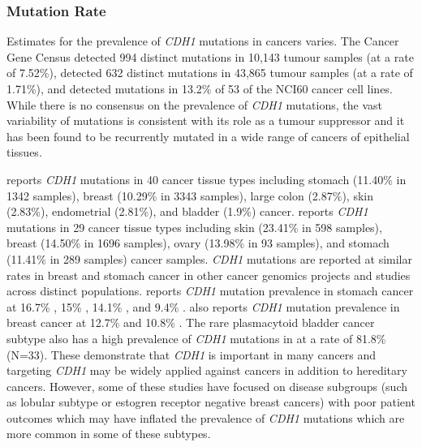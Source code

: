 \subsubsection{Mutation Rate}

Estimates for the prevalence of \textit{CDH1}  \glspl{mutation}  in  cancers varies. The Cancer Gene Census \citep{Futreal2004, Pleasance2010} detected 994 distinct \glspl{mutation} in 10,143 tumour samples (at a rate of 7.52\%), \citet{COSMICdb} detected 632 distinct \glspl{mutation} in 43,865 tumour samples (at a rate of 1.71\%), and detected \glspl{mutation} in 13.2\% of 53 of the NCI60 cancer cell lines. While there is no consensus on the prevalence of \textit{CDH1} \glspl{mutation}, the vast variability of \glspl{mutation} is consistent with its role as a \gls{tumour suppressor} and it has been found to be recurrently mutated in a wide range of cancers of epithelial tissues.

\citet{COSMICdb} reports \textit{CDH1} \glspl{mutation} in 40 cancer tissue types including stomach (11.40\% in 1342 samples), breast (10.29\% in 3343 samples), large colon (2.87\%), skin (2.83\%), endometrial (2.81\%), and bladder (1.9\%) cancer. \citet{ICGC2017web} reports \textit{CDH1} \glspl{mutation} in 29 cancer tissue types including skin (23.41\% in 598 samples), breast (14.50\% in 1696 samples), ovary (13.98\% in 93 samples), and stomach (11.41\% in 289 samples) cancer samples. \textit{CDH1} \glspl{mutation} are reported at similar rates in breast and stomach cancer in other cancer \glspl{genomic} projects and studies across distinct populations. \citet{cBioPortal} reports \textit{CDH1} \gls{mutation} prevalence in stomach cancer at 16.7\% \citep[30 samples]{Kakiuchi2014}, 15\% \citep[100 samples]{Wang2014}, 14.1\% \citep[78 samples]{Chen2015}, and 9.4\% \citep[393 samples]{TCGA2017prov}. \citet{cBioPortal} also reports \textit{CDH1} \gls{mutation} prevalence in breast cancer at 12.7\% \citep[963 samples]{TCGA2017prov} and 10.8\% \citep[2051 samples]{METABRIC2012, METABRIC2016}. The rare plasmacytoid bladder cancer subtype also has a high prevalence of \textit{CDH1} \glspl{mutation} in \citet{COSMICdb} at a rate of 81.8\% (N=33). These demonstrate that \textit{CDH1} is important in many cancers and targeting \textit{CDH1} may be widely applied against  cancers in addition to \gls{hereditary} cancers. However, some of these studies have focused on disease subgroups (such as lobular subtype or estogren receptor negative breast cancers) with poor patient outcomes which may have inflated the prevalence of \textit{CDH1} \glspl{mutation} which are more common in some of these subtypes.

